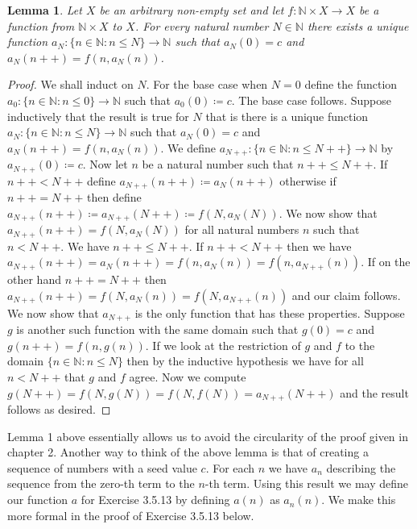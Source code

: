 \documentclass{article}
\newtheorem{lemma}{Lemma}
\begin{document}
	\begin{lemma}
		Let $X$ be an arbitrary non-empty set and let $f:\mathbb{N} \times X \rightarrow X$ be a function from $\mathbb{N} \times X$ to $X$. For every natural number $N \in \mathbb{N}$ there exists a unique function $a_{N}:\{n \in \mathbb{N}:n \leq N\} \rightarrow \mathbb{N}$ such that $a_{N}(0) = c$ and $a_{N}(n++) = f(n,a_{N}(n))$.
	\end{lemma}
	
	\begin{proof}
		We shall induct on $N$. For the base case when $N = 0$ define the function $a_{0}:\{n \in \mathbb{N}:n \leq 0\} \rightarrow \mathbb{N}$ such that $a_{0}(0) \coloneqq c$. The base case follows. Suppose inductively that the result is true for $N$ that is there is a unique function $a_{N}:\{n \in \mathbb{N}:n \leq N\} \rightarrow \mathbb{N}$
		such that $a_{N}(0) = c$ and $a_{N}(n++) = f(n,a_{N}(n))$. We define  $a_{N++}:\{n \in \mathbb{N}:n \leq N++\} \rightarrow \mathbb{N}$ by $a_{N++}(0) \coloneqq c$. Now let $n$ be a natural number such that $n++ \leq N++$. If $n++ < N++$ define $a_{N++}(n++) \coloneqq
		a_{N}(n++)$ otherwise if $n++ = N++$ then define  $a_{N++}(n++) \coloneqq a_{N++}(N++) \coloneqq f(N,a_{N}(N))$. We now show that $a_{N++}(n++) =  f(N,a_{N}(N))$ for all natural numbers $n$ such that $n < N++$. We have $n++ \leq N++$. If $n++ < N++$ then we have  $a_{N++}(n++) = a_{N}(n++) = f(n, a_{N}(n)) = f(n, a_{N++}(n))$. If on the other hand $n++ = N++$ then $a_{N++}(n++) = f(N, a_{N}(n))= f(N, a_{N++}(n))$ and our claim follows. We now show that $a_{N++}$ is the only function that has these properties. Suppose $g$ is another such function with the same domain such that $g(0) = c$ and
		$g(n++) = f(n,g(n))$. If we look at the restriction of $g$ and $f$ to the domain $\{n \in \mathbb{N}:n \leq N\}$ then by the inductive hypothesis we have for all $n < N++$ that $g$ and $f$ agree. Now we compute $g(N++) = f(N, g(N)) = f(N, f(N)) = a_{N++}(N++)$ and the result follows as desired.
	\end{proof}
	
	\noindent Lemma 1 above essentially allows us to avoid the circularity of the proof given in chapter 2. Another way to think of the above lemma is that of creating a sequence of numbers with a seed value $c$. For each $n$ we have $a_{n}$ describing the sequence from the zero-th term to the $n$-th term. Using this result we may define our function $a$ for Exercise 3.5.13 by defining $a(n)$ as $a_{n}(n)$. We make this more formal in the proof of Exercise 3.5.13 below.
	
\end{document}
